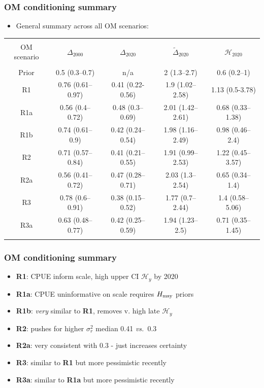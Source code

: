 \documentclass{beamer}
\newcommand{\sigr}{\sigma^2_r}
\newcommand{\tdel}{\tilde\Delta}
\newcommand{\hmsy}{H_{\rm msy}}
\newcommand{\vs}{\textit{vs.}~}
\begin{document}
\begin{frame}
    \frametitle{OM conditioning summary}
\begin{itemize}
    \item General summary across all OM scenarios:
\end{itemize}
    \tiny{
\begin{table}
    \begin{center}
        \begin{tabular}{|ccccc|}
            \hline
            & & & & \\
            OM scenario & $\Delta_{2000}$ & $\Delta_{2020}$ & $\tdel_{2020}$ & $\mathcal{H}_{2020}$\\
            & & & & \\
Prior & 0.5 (0.3–0.7)    & n/a              & 2 (1.3–2.7)      & 0.6 (0.2–1) \\
R1    & 0.76 (0.61–0.97) & 0.41 (0.22-0.56) & 1.9 (1.02–2.58)  & 1.13 (0.5-3.78) \\
R1a   & 0.56 (0.4–0.72)  & 0.48 (0.3–0.69)  & 2.01 (1.42–2.61) & 0.68 (0.33–1.38) \\
R1b   & 0.74 (0.61–0.9)  & 0.42 (0.24–0.54) & 1.98 (1.16–2.49) & 0.98 (0.46–2.4) \\
R2    & 0.71 (0.57–0.84) & 0.41 (0.21–0.55) & 1.91 (0.99–2.53) & 1.22 (0.45–3.57) \\
R2a   & 0.56 (0.41–0.72) & 0.47 (0.28–0.71) & 2.03 (1.3–2.54)  & 0.65 (0.34–1.4) \\
R3    & 0.78 (0.6–0.91)  & 0.38 (0.15–0.52) & 1.77 (0.7–2.44)  & 1.4 (0.58–5.06) \\
R3a   & 0.63 (0.48–0.77) & 0.42 (0.25–0.59) & 1.94 (1.23–2.5)  & 0.71 (0.35–1.45) \\
            & & & & \\
            \hline
        \end{tabular}
    \end{center}
\end{table}
}
\end{frame}
\begin{frame}
    \frametitle{OM conditioning summary}
\begin{itemize}
    \item \textbf{R1}: CPUE inform scale, high upper CI $\mathcal{H}_y$ by 2020
    \item \textbf{R1a}: CPUE uninformative on scale requires $\hmsy$ priors
    \item \textbf{R1b}: \emph{very} similar to \textbf{R1}, removes v. high late $\mathcal{H}_y$
    \item \textbf{R2}: pushes for higher $\sigr$ median 0.41 \vs 0.3
    \item \textbf{R2a}: very consistent with 0.3 - just increases certainty
    \item \textbf{R3}: similar to \textbf{R1} but more pessimistic recently
    \item \textbf{R3a}: similar to \textbf{R1a} but more pessimistic recently 
\end{itemize}
\end{frame}
\end{document}
